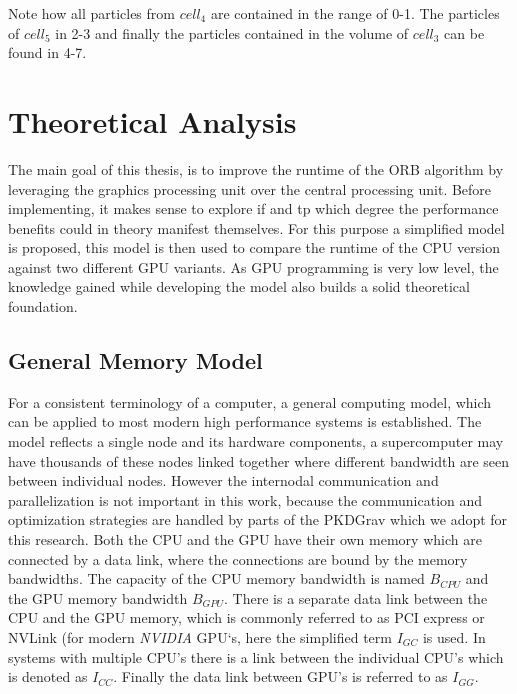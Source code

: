 \documentclass[]{article}
\begin{document}
\begin{figure}[H]
	\begin{center}
	\end{center}
\end{figure}

Note how all particles from $cell_4$ are contained in the range of 0-1. The particles of $cell_5$ in 2-3 and finally the particles contained in the volume of $cell_3$ can be found in 4-7.


\newpage
\section{Theoretical Analysis}

The main goal of this thesis, is to improve the runtime of the ORB algorithm by leveraging the graphics processing unit over the central processing unit. Before implementing, it makes sense to explore if and tp which degree the performance benefits could in theory manifest themselves. For this purpose a simplified model is proposed, this model is then used to compare the runtime of the CPU version against two different GPU variants. As GPU programming is very low level, the knowledge gained while developing the model also builds a solid theoretical foundation.

\subsection{General Memory Model}\label{sec:gmm}

For a consistent terminology of a computer, a general computing model, which can be applied to most modern high performance systems is established. The model reflects a single node and its hardware components, a supercomputer may have thousands of these nodes linked together where different bandwidth are seen between individual nodes.
However the internodal communication and parallelization is not important in this work, because the communication and optimization strategies are handled by parts of the PKDGrav which we adopt for this research.
Both the CPU and the GPU have their own memory which are connected by a data link, where the connections are bound by the memory bandwidths. The capacity of the CPU memory bandwidth is named $B_{CPU}$ and the GPU memory bandwidth $B_{GPU}$. There is a separate data link between the CPU and the GPU memory, which is commonly referred to as PCI express or NVLink (for modern \textit{NVIDIA} GPU`s, here the simplified term $I_{GC}$ is used. In systems with multiple CPU's there is a link between the individual CPU's which is denoted as $I_{CC}$. Finally the data link between GPU's is referred to as $I_{GG}$.
\end{document}
